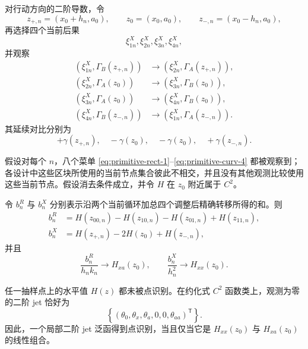 对行动方向的二阶导数，令
\[
z_{+,n}=(x_0+h_n,a_0),\qquad
z_{0}=(x_0,a_0),\qquad
z_{-,n}=(x_0-h_n,a_0),
\]
再选择四个当前后果
\[
\xi^X_{1n},\xi^X_{2n},\xi^X_{3n},\xi^X_{4n},
\]
并观察
\begin{align}
(\xi^X_{1n},\Gamma_B(z_{+,n}))
&\longrightarrow
(\xi^X_{2n},\Gamma_A(z_{+,n})),
\label{eq:primitive-curv-1}\\
(\xi^X_{2n},\Gamma_A(z_{0}))
&\longrightarrow
(\xi^X_{3n},\Gamma_B(z_{0})),
\label{eq:primitive-curv-2}\\
(\xi^X_{3n},\Gamma_A(z_{0}))
&\longrightarrow
(\xi^X_{4n},\Gamma_B(z_{0})),
\label{eq:primitive-curv-3}\\
(\xi^X_{4n},\Gamma_B(z_{-,n}))
&\longrightarrow
(\xi^X_{1n},\Gamma_A(z_{-,n})).
\label{eq:primitive-curv-4}
\end{align}
其延续对比分别为
\[
+\gamma(z_{+,n}),\quad
-\gamma(z_0),\quad
-\gamma(z_0),\quad
+\gamma(z_{-,n}).
\]

\begin{theorem}[双区块设计中的二阶识别]
\label{thm:derivatives-without-levels}
假设对每个 $n$，八个菜单
\eqref{eq:primitive-rect-1}--\eqref{eq:primitive-curv-4}
都被观察到；各设计中这些区块所使用的当前节点集合彼此不相交，并且没有其他观测比较使用这些当前节点。假设消去条件成立，并令 $H$ 在 $z_0$ 附近属于 $C^2$。

令 $b_n^R$ 与 $b_n^X$ 分别表示沿两个当前循环加总四个调整后精确转移所得的和。则
\begin{align}
b_n^R
&=
H(z_{00,n})-H(z_{10,n})-H(z_{01,n})+H(z_{11,n}),
\label{eq:rectangle-cycle-residual}\\
b_n^X
&=
H(z_{+,n})-2H(z_0)+H(z_{-,n}),
\label{eq:curvature-cycle-residual}
\end{align}
并且
\begin{equation}
\boxed{
\frac{b_n^R}{h_nk_n}\longrightarrow H_{xa}(z_0),
\qquad
\frac{b_n^X}{h_n^2}\longrightarrow H_{xx}(z_0).}
\label{eq:derivatives-without-levels-limit}
\end{equation}

任一抽样点上的水平值 $H(z)$ 都未被点识别。在约化式 $C^2$ 函数类上，观测为零的二阶 jet 恰好为
\begin{equation}
\boxed{
\left\{
(\theta_0,\theta_x,\theta_a,0,0,\theta_{aa})^{\mathsf T}
\right\}.}
\label{eq:block-null-jets}
\end{equation}
因此，一个局部二阶 jet 泛函得到点识别，当且仅当它是 $H_{xx}(z_0)$ 与 $H_{xa}(z_0)$ 的线性组合。
\end{theorem}

